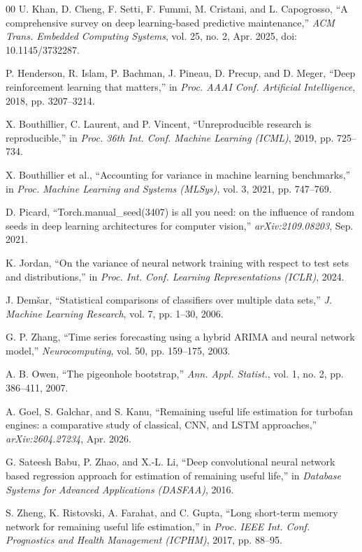 \documentclass[conference]{IEEEtran}
\begin{document}
\begin{thebibliography}{00}
 U. Khan, D. Cheng, F. Setti, F. Fummi, M. Cristani, and L. Capogrosso, ``A comprehensive survey on deep learning-based predictive maintenance,'' \emph{ACM Trans. Embedded Computing Systems}, vol. 25, no. 2, Apr. 2025, doi: 10.1145/3732287.

 P. Henderson, R. Islam, P. Bachman, J. Pineau, D. Precup, and D. Meger, ``Deep reinforcement learning that matters,'' in \emph{Proc. AAAI Conf. Artificial Intelligence}, 2018, pp. 3207--3214.

 X. Bouthillier, C. Laurent, and P. Vincent, ``Unreproducible research is reproducible,'' in \emph{Proc. 36th Int. Conf. Machine Learning (ICML)}, 2019, pp. 725--734.

 X. Bouthillier et al., ``Accounting for variance in machine learning benchmarks,'' in \emph{Proc. Machine Learning and Systems (MLSys)}, vol. 3, 2021, pp. 747--769.

 D. Picard, ``Torch.manual\_seed(3407) is all you need: on the influence of random seeds in deep learning architectures for computer vision,'' \emph{arXiv:2109.08203}, Sep. 2021.

 K. Jordan, ``On the variance of neural network training with respect to test sets and distributions,'' in \emph{Proc. Int. Conf. Learning Representations (ICLR)}, 2024.

 J. Dem\v{s}ar, ``Statistical comparisons of classifiers over multiple data sets,'' \emph{J. Machine Learning Research}, vol. 7, pp. 1--30, 2006.

 G. P. Zhang, ``Time series forecasting using a hybrid ARIMA and neural network model,'' \emph{Neurocomputing}, vol. 50, pp. 159--175, 2003.

 A. B. Owen, ``The pigeonhole bootstrap,'' \emph{Ann. Appl. Statist.}, vol. 1, no. 2, pp. 386--411, 2007.

 A. Goel, S. Galchar, and S. Kanu, ``Remaining useful life estimation for turbofan engines: a comparative study of classical, CNN, and LSTM approaches,'' \emph{arXiv:2604.27234}, Apr. 2026.

 G. Sateesh Babu, P. Zhao, and X.-L. Li, ``Deep convolutional neural network based regression approach for estimation of remaining useful life,'' in \emph{Database Systems for Advanced Applications (DASFAA)}, 2016.

 S. Zheng, K. Ristovski, A. Farahat, and C. Gupta, ``Long short-term memory network for remaining useful life estimation,'' in \emph{Proc. IEEE Int. Conf. Prognostics and Health Management (ICPHM)}, 2017, pp. 88--95.


\end{thebibliography}
\end{document}
